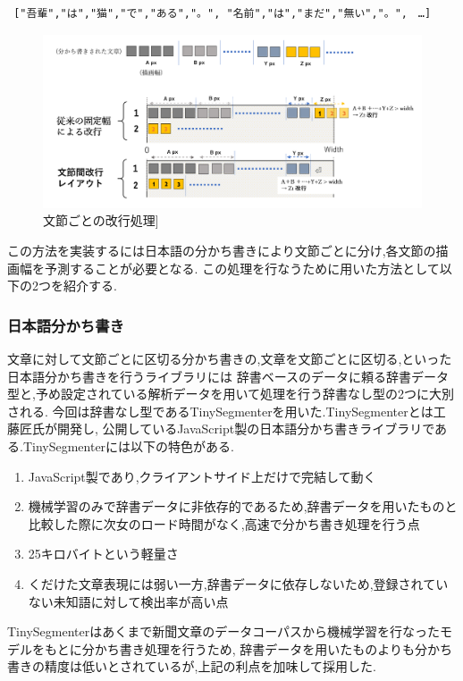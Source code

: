 \begin{verbatim} ["吾輩","は","猫","で","ある","。", "名前","は","まだ","無い","。",　…]
\end{verbatim}

\begin{figure}[H]
    \centering
    \label{fig:image14}
    \includegraphics[width=0.6\columnwidth]{image/03/img6.png}
	\caption[文節ごとの改行処理]{文節ごとの改行処理]}
\end{figure}

この方法を実装するには日本語の分かち書きにより文節ごとに分け,各文節の描画幅を予測することが必要となる.
この処理を行なうために用いた方法として以下の2つを紹介する.

\subsubsection{日本語分かち書き}
文章に対して文節ごとに区切る分かち書きの,文章を文節ごとに区切る,といった日本語分かち書きを行うライブラリには
辞書ベースのデータに頼る辞書データ型と,予め設定されている解析データを用いて処理を行う辞書なし型の2つに大別される.
今回は辞書なし型であるTinySegmenterを用いた.TinySegmenterとは工藤匠氏が開発し,
公開しているJavaScript製の日本語分かち書きライブラリである.\footnotemark[3]
TinySegmenterには以下の特色がある.

\begin{enumerate}
	\item JavaScript製であり,クライアントサイド上だけで完結して動く
	\item 機械学習のみで辞書データに非依存的であるため,辞書データを用いたものと比較した際に次女のロード時間がなく,高速で分かち書き処理を行う点
	\item 25キロバイトという軽量さ
	\item くだけた文章表現には弱い一方,辞書データに依存しないため,登録されていない未知語に対して検出率が高い点
\end{enumerate}
TinySegmenterはあくまで新聞文章のデータコーパスから機械学習を行なったモデルをもとに分かち書き処理を行うため,
辞書データを用いたものよりも分かち書きの精度は低いとされているが,上記の利点を加味して採用した.

